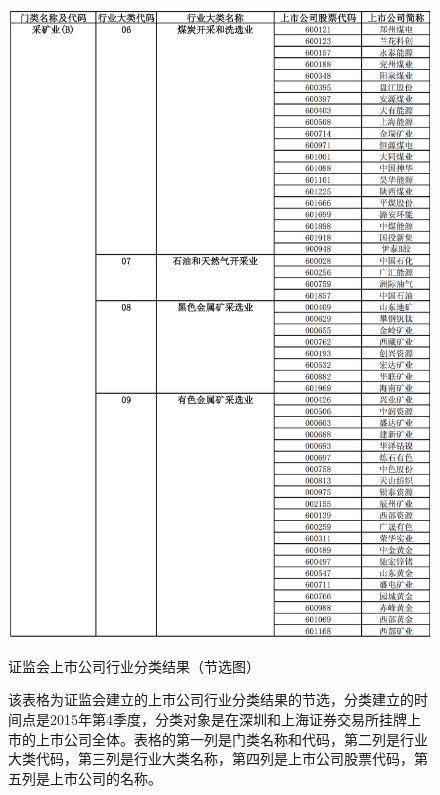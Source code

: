 \documentclass{sysuthesis}
\begin{document}
  \begin{figure}[h!tbp]
  \centering
  \includegraphics[scale=0.6]{image/2015年4季度上市公司行业分类结果.png}
  \caption{证监会上市公司行业分类结果（节选图）}
  \caption*{\footnotesize 该表格为证监会建立的上市公司行业分类结果的节选，分类建立的时间点是2015年第4季度，分类对象是在深圳和上海证券交易所挂牌上市的上市公司全体。表格的第一列是门类名称和代码，第二列是行业大类代码，第三列是行业大类名称，第四列是上市公司股票代码，第五列是上市公司的名称。}
  \label{fig:classify-output}
  \end{figure}
\end{document}

